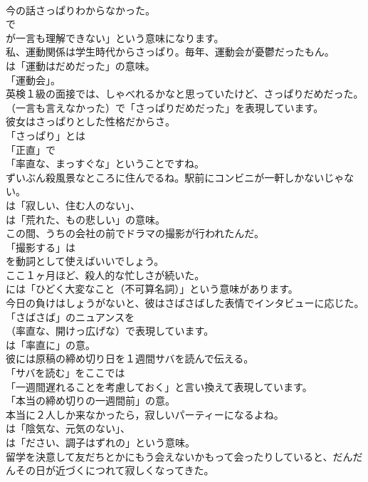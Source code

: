 \documentclass[8pt]{extreport}
\begin{document}
\begin{CJK}{UTF8}{min}
\\	今の話さっぱりわからなかった。 
\\	で
\\	が一言も理解できない」という意味になります。	
\\	私、運動関係は学生時代からさっぱり。毎年、運動会が憂鬱だったもん。 
\\	は「運動はだめだった」の意味。
\\	「運動会」。	
\\	英検１級の面接では、しゃべれるかなと思っていたけど、さっぱりだめだった。 
\\	（一言も言えなかった）で「さっぱりだめだった」を表現しています。	
\\	彼女はさっぱりとした性格だからさ。 
\\	「さっぱり」とは
\\	「正直」で
\\	「率直な、まっすぐな」ということですね。	
\\	ずいぶん殺風景なところに住んでるね。駅前にコンビニが一軒しかないじゃない。 
\\	は「寂しい、住む人のない」、
\\	は「荒れた、もの悲しい」の意味。	
\\	この間、うちの会社の前でドラマの撮影が行われたんだ。 
\\	「撮影する」は
\\	を動詞として使えばいいでしょう。	
\\	ここ１ヶ月ほど、殺人的な忙しさが続いた。 
\\	には「ひどく大変なこと（不可算名詞）」という意味があります。	
\\	今日の負けはしょうがないと、彼はさばさばした表情でインタビューに応じた。 
\\	「さばさば」のニュアンスを 
\\	（率直な、開けっ広げな）で表現しています。
\\	は「率直に」の意。	
\\	彼には原稿の締め切り日を１週間サバを読んで伝える。 
\\	「サバを読む」をここでは
\\	「一週間遅れることを考慮しておく」と言い換えて表現しています。
\\	「本当の締め切りの一週間前」の意。	
\\	本当に２人しか来なかったら，寂しいパーティーになるよね。 
\\	は「陰気な、元気のない」、
\\	は「ださい、調子はずれの」という意味。	
\\	留学を決意して友だちとかにもう会えないかもって会ったりしていると、だんだんその日が近づくにつれて寂しくなってきた。 

\end{CJK}
\end{document}

